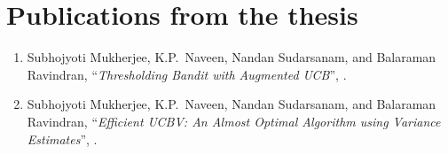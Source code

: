 \documentclass[MS,synopsis]{iitmdiss}
\begin{document}
\section{Publications from the thesis}
\begin{enumerate}
\item Subhojyoti Mukherjee, K.P.~Naveen, Nandan Sudarsanam, and Balaraman Ravindran, ``\textit{Thresholding Bandit with Augmented UCB}'', .
\item Subhojyoti Mukherjee, K.P.~Naveen, Nandan Sudarsanam, and Balaraman Ravindran, ``\textit{Efficient UCBV: An Almost Optimal Algorithm using Variance Estimates}'', .
\end{enumerate}


\end{document}
